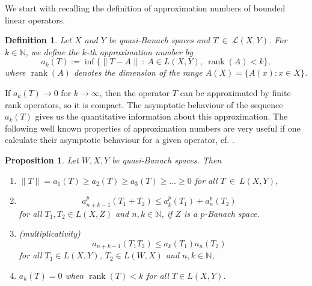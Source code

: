 \documentclass[12pt]{article}
\newtheorem{Prop}{Proposition}
\newtheorem{Def}{Definition}
\DeclareMathOperator{\rank}{rank}
\newcommand{\N}{{\mathbb N}}
\newcommand{\cl}{{\mathcal{L}}}
\begin{document}
We start with recalling the definition of approximation numbers of bounded linear operators. 
\begin{Def}
	Let $X$ and $Y$ be quasi-Banach spaces and $T~\in~\cl(X,Y)$. 
	For $k\in \N$, we define the \textit{$k$-th approximation number} by
	\begin{displaymath}
		a_k(T):=\inf\{\|T-A\|\ :\ A\in L(X,Y),\ \rank(A)<k\},
	\end{displaymath}
	where $\rank(A)$ denotes the dimension of the range $A(X)=\{A(x): x\in X\}$.
\end{Def}
If $a_k(T)\rightarrow 0$ for $k\rightarrow \infty$, then the operator $T$ can be approximated by finite rank operators, so it is compact. The asymptotic behaviour of the sequence $a_k(T)$ gives us the quantitative information about this approximation. %
The following well known properties of approximation numbers are very useful if one calculate their  asymptotic behaviour for a given operator, cf.  \cite{ ET,Pi2,Pi}.   


\begin{Prop}\label{prop}
	Let  $W, X, Y$ be quasi-Banach spaces.
	Then
	\begin{enumerate}
		\item $ \|T\|=a_1(T)\geq a_2(T)\geq a_3(T)\geq\ldots\geq 0$\quad
		for all $T~\in~L(X,Y)$,
		\item {} $$a_{n+k-1}^p (T_1 +T_2)\leq a_k^p(T_1) + a_n^p(T_2)\quad  $$
		for all  $T_1,T_2\in L(X,Z)$ and $n,k\in\N$, if $Z$ is a $p$-Banach space. 
		\item {\normalfont(multiplicativity)} $$a_{n+k-1} (T_1T_2)\leq a_k(T_1)a_n(T_2)\quad $$
		for all $T_1\in L(X,Y)$, $T_2\in L(W,X)$ and $n,k\in\N$, 
		\item  $a_k(T)=0$ when $\rank(T)<k$
		for all $T\in L(X,Y)$. %
	\end{enumerate}
	\end{Prop}
\end{document}
